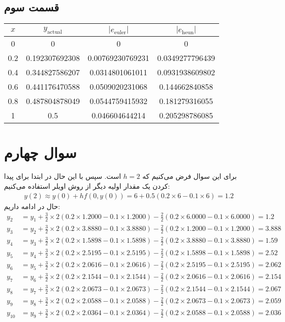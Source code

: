 \documentclass[]{article}
\begin{document}
\subsection*{قسمت سوم}
\begin{latin}
    \centering
    \begin{tabular}{c|c|c|c}
        $x$ & $y_{\text{actual}}$ & $|e_{\text{euler}}|$ & $|e_{\text{heun}}|$\\
        \hline
        0 & 0 & 0 & 0\\
        0.2 & 0.192307692308 & 0.00769230769231 & 0.0349277796439\\
        0.4 & 0.344827586207 & 0.0314801061011 & 0.0931938609802 \\
        0.6 & 0.441176470588 & 0.0509020231068 & 0.144662840858\\
        0.8 & 0.487804878049 & 0.0544759415932 & 0.181279316055\\
        1 & 0.5 & 0.046604644214 & 0.205298786085\\
    \end{tabular}
\end{latin}
\section*{سوال چهارم}
برای این سوال فرض می‌کنیم که
$h = 2$
است. سپس با این حال در ابتدا برای پیدا کردن یک مقدار اولیه دیگر از روش اویلر استفاده می‌کنیم:
\begin{gather*}
    y(2) \approx y(0) + h f(0, y(0)) = 6 + 0.5 (0.2 \times 6 - 0.1 \times 6) = 1.2
\end{gather*}
حال در ادامه داریم:
\begin{align*}
    y_2 &= y_1 + \frac{3}{2} \times 2 (0.2 \times 1.2000 - 0.1 \times 1.2000) - \frac{2}{2} (0.2 \times 6.0000 - 0.1 \times 6.0000) = 1.2\\
y_3 &= y_2 + \frac{3}{2} \times 2 (0.2 \times 3.8880 - 0.1 \times 3.8880) - \frac{2}{2} (0.2 \times 1.2000 - 0.1 \times 1.2000) = 3.888\\
y_4 &= y_3 + \frac{3}{2} \times 2 (0.2 \times 1.5898 - 0.1 \times 1.5898) - \frac{2}{2} (0.2 \times 3.8880 - 0.1 \times 3.8880) = 1.59\\
y_5 &= y_4 + \frac{3}{2} \times 2 (0.2 \times 2.5195 - 0.1 \times 2.5195) - \frac{2}{2} (0.2 \times 1.5898 - 0.1 \times 1.5898) = 2.52\\
y_6 &= y_5 + \frac{3}{2} \times 2 (0.2 \times 2.0616 - 0.1 \times 2.0616) - \frac{2}{2} (0.2 \times 2.5195 - 0.1 \times 2.5195) = 2.062\\
y_7 &= y_6 + \frac{3}{2} \times 2 (0.2 \times 2.1544 - 0.1 \times 2.1544) - \frac{2}{2} (0.2 \times 2.0616 - 0.1 \times 2.0616) = 2.154\\
y_8 &= y_7 + \frac{3}{2} \times 2 (0.2 \times 2.0673 - 0.1 \times 2.0673) - \frac{2}{2} (0.2 \times 2.1544 - 0.1 \times 2.1544) = 2.067\\
y_9 &= y_8 + \frac{3}{2} \times 2 (0.2 \times 2.0588 - 0.1 \times 2.0588) - \frac{2}{2} (0.2 \times 2.0673 - 0.1 \times 2.0673) = 2.059\\
y_{10} &= y_9 + \frac{3}{2} \times 2 (0.2 \times 2.0364 - 0.1 \times 2.0364) - \frac{2}{2} (0.2 \times 2.0588 - 0.1 \times 2.0588) = \boxed{2.036}
\end{align*}
\end{document}
